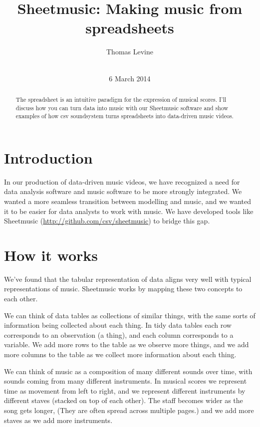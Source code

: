 \documentclass{acm_proc_article-sp}
\begin{document}
\title{Sheetmusic: Making music from spreadsheets}
\author{
\alignauthor
Thomas Levine\\
       \\
}
\date{6 March 2014}
\maketitle
\begin{abstract}
The spreadsheet is an intuitive paradigm for the expression of musical
scores. I'll discuss how you can turn data into music with our Sheetmusic
software and show examples of how csv soundsystem turns spreadsheets
into data-driven music videos.
\end{abstract}
\section{Introduction}
In our production of data-driven music videos, we have recognized a need
for data analysis software and music software to be more strongly integrated.
We wanted a more seamless transition between modelling and music, and we
wanted it to be easier for data analysts to work with music. We have
developed tools like Sheetmusic (\url{http://github.com/csv/sheetmusic})
to bridge this gap.

\section{How it works}
We've found that the tabular representation of data aligns very well with
typical representations of music. Sheetmusic works by mapping these two
concepts to each other.

We can think of data tables as collections of similar things, with the
same sorts of information being collected about each thing. In tidy data
tables \cite{tidydata} each row corresponds to an observation (a thing),
and each column corresponds to a variable. We add more rows to the table
as we observe more things, and we add more columns to the table as we
collect more information about each thing.

We can think of music as a composition of many different sounds over time,
with sounds coming from many different instruments. In musical scores
we represent time as movement from left to right, and we represent different
instruments by different staves (stacked on top of each other).
The staff becomes wider as the song gets longer, (They are often spread
across multiple pages.) and we add more staves as we add more instruments.
\end{document}
